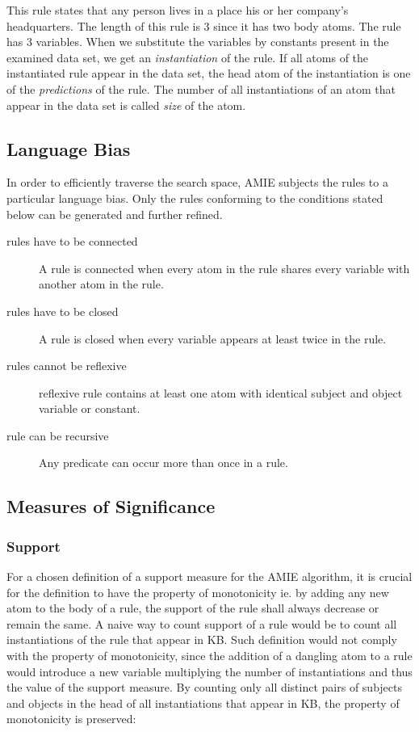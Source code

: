 This rule states that any person lives in a place his or her company's headquarters. The length of this rule is 3 since it has two body atoms. The rule has 3 variables. When we substitute the variables by constants present in the examined data set, we get an \textit{instantiation} of the rule. If all atoms of the instantiated rule appear in the data set, the head atom of the instantiation is one of the \textit{predictions} of the rule. The number of all instantiations of an atom that appear in the data set is called \textit{size} of the atom.

\subsection{Language Bias\label{languagebias}}

In order to efficiently traverse the search space, AMIE subjects the rules to a particular language bias. Only the rules conforming to the conditions stated below can be generated and further refined.

\begin{description}
    \item[rules have to be connected] A rule is connected when every atom in the rule shares every variable with another atom in the rule.
    \item[rules have to be closed] A rule is closed when every variable appears at least twice in the rule.
    \item[rules cannot be reflexive] reflexive rule contains at least one atom with identical subject and object variable or constant.
    \item[rule can be recursive] Any predicate can occur more than once in a rule.
\end{description}

\subsection{Measures of Significance}

\subsubsection{Support}

For a chosen definition of a support measure for the AMIE algorithm, it is crucial for the definition to have the property of monotonicity ie. by adding any new atom to the body of a rule, the support of the rule shall always decrease or remain the same. A naive way to count support of a rule would be to count all instantiations of the rule that appear in KB. Such definition would not comply with the property of monotonicity, since the addition of a dangling atom to a rule would introduce a new variable multiplying the number of instantiations and thus the value of the support measure. By counting only all distinct pairs of subjects and objects in the head of all instantiations that appear in KB, the property of monotonicity is preserved:

